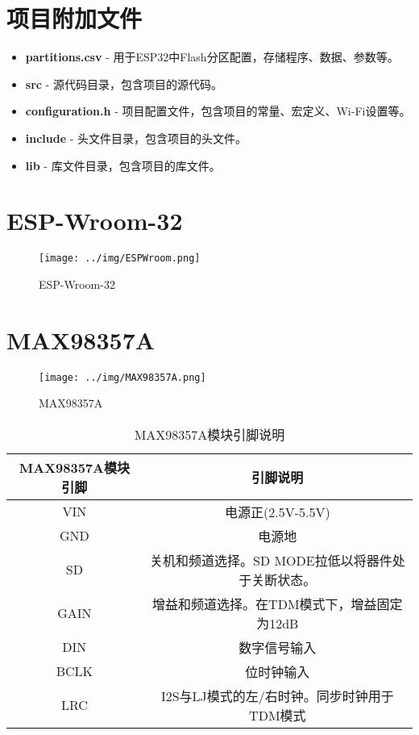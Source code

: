 \section{项目附加文件}
\begin{itemize}
    \item \textbf{partitions.csv} - 用于ESP32中Flash分区配置，存储程序、数据、参数等。
    \item \textbf{src} - 源代码目录，包含项目的源代码。
    \item \textbf{configuration.h} - 项目配置文件，包含项目的常量、宏定义、Wi-Fi设置等。
    \item \textbf{include} - 头文件目录，包含项目的头文件。
    \item \textbf{lib} - 库文件目录，包含项目的库文件。
\end{itemize}

\section{ESP-Wroom-32}

\begin{figure} [H]
    \centering
    \texttt{[image: ../img/ESPWroom.png]}
    \caption{ESP-Wroom-32}
\end{figure}
\section{MAX98357A}

\begin{figure} [H]
    \centering
    \texttt{[image: ../img/MAX98357A.png]}
    \caption{MAX98357A}
\end{figure}

\begin{table} [H]
    \centering
    \begin{tabular}{|c|c|}
        \hline
        \textbf{MAX98357A模块引脚} & \textbf{引脚说明}                \\ \hline
        VIN                    & 电源正(2.5V-5.5V)               \\ \hline
        GND                    & 电源地                          \\ \hline
        SD                     & 关机和频道选择。SD MODE拉低以将器件处于关断状态。 \\ \hline
        GAIN                   & 增益和频道选择。在TDM模式下，增益固定为12dB    \\ \hline
        DIN                    & 数字信号输入                       \\ \hline
        BCLK                   & 位时钟输入                        \\ \hline
        LRC                    & I2S与LJ模式的左/右时钟。同步时钟用于TDM模式   \\ \hline
    \end{tabular}
    \caption{MAX98357A模块引脚说明}
\end{table}

